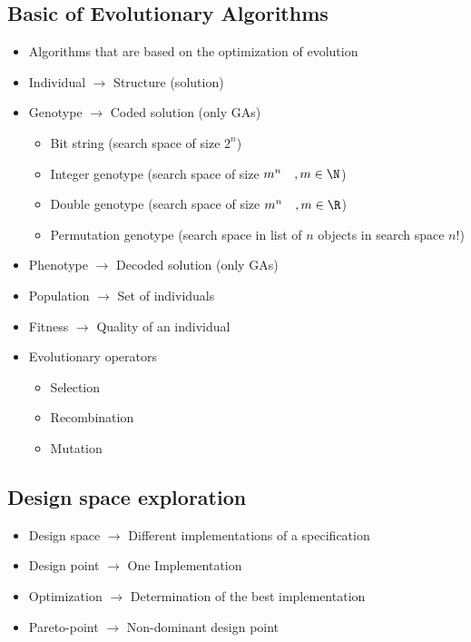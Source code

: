 \subsection{Basic of Evolutionary Algorithms}
\begin{itemize}
	\item Algorithms that are based on the optimization of evolution
	\item \glqq{}Individual\grqq{} $\rightarrow$ Structure (solution)
	\item \glqq{}Genotype\grqq{} $\rightarrow$ Coded solution (only GAs)
\begin{itemize}
	\item Bit string (search space of size $2^n$)
	\item Integer genotype (search space of size $m^n \quad, m\in\N$)
	\item Double genotype (search space of size $m^n \quad, m\in\R$)
	\item Permutation genotype (search space in list of $n$ objects in search space $n!$) 
\end{itemize}

	\item \glqq{}Phenotype\grqq{} $\rightarrow$ Decoded solution (only GAs)
	\item \glqq{}Population\grqq{} $\rightarrow$ Set of individuals
	\item \glqq{}Fitness\grqq{} $\rightarrow$ Quality of an individual
	\item Evolutionary operators
\begin{itemize}
	\item Selection
	\item Recombination
	\item Mutation
\end{itemize}
\end{itemize}

\subsection{Design space exploration}
\begin{itemize}
	\item Design space $\rightarrow$ Different implementations of a specification
	\item Design point $\rightarrow$ One Implementation
	\item Optimization $\rightarrow$ Determination of the \glqq{}best\grqq{} implementation
	\item Pareto-point $\rightarrow$ Non-dominant design point 
\end{itemize}

